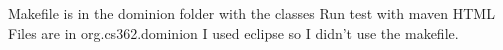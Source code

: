 Makefile is in the dominion folder with the classes
Run test with maven
HTML Files are in org.cs362.dominion
I used eclipse so I didn't use the makefile.